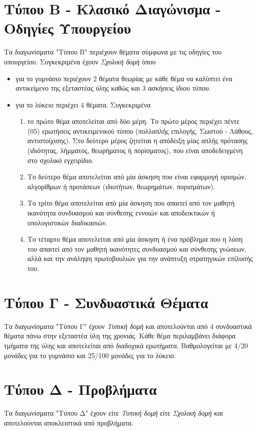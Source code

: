 \documentclass[11pt,a4paper]{book}
\begin{document}
\section{Τύπου Β - Κλασικό Διαγώνισμα - Οδηγίες Υπουργείου}
\noindent
Τα διαγωνίσματα "Τύπου Β" περιέχουν θέματα σύμφωνα με τις οδηγίες του υπουργείου. Συγκεκριμένα έχουν \textit{Σχολική δομή} όπου
\begin{itemize}
\item για το γυμνάσιο περιέχουν 2 θέματα θεωρίας με κάθε θέμα να καλύπτει ένα αντικείμενο της εξεταστέας ύλης καθώς και 3 ασκήσεις ίδιου τύπου.
\item για το λύκειο περιέχει 4 θέματα. Συγκεκριμένα
\begin{enumerate}
\item το πρώτο θέμα αποτελείται από δύο μέρη. Το πρώτο μέρος περιέχει πέντε (05) ερωτήσεις αντικειμενικού τύπου (πολλαπλής επιλογής, Σωστού - Λάθους, αντιστοίχισης). Στο δεύτερο μέρος ζητείται η απόδειξη μίας απλής πρότασης (ιδιότητας, λήμματος, θεωρήματος ή πορίσματος), που είναι αποδεδειγμένη στο σχολικό εγχειρίδιο.
\item Το δεύτερο θέμα αποτελείται από μία άσκηση που είναι εφαρμογή ορισμών, αλγορίθμων ή προτάσεων (ιδιοτήτων, θεωρημάτων, πορισμάτων).
\item Το τρίτο θέμα αποτελείται από μία άσκηση που απαιτεί από τον μαθητή ικανότητα συνδυασμού και σύνθεσης εννοιών και αποδεικτικών ή υπολογιστικών διαδικασιών.
\item Το τέταρτο θέμα αποτελείται από μία άσκηση ή ένα πρόβλημα που η λύση του απαιτεί από τον μαθητή ικανότητες συνδυασμού και σύνθεσης γνώσεων, αλλά και την ανάληψη πρωτοβουλιών για την ανάπτυξη στρατηγικών επίλυσής του.
\end{enumerate}
\end{itemize}
\section{Τύπου Γ - Συνδυαστικά Θέματα}
\noindent
Τα διαγωνίσματα "Τύπου Γ" έχουν \textit{Τυπική δομή} και αποτελούνται από $4$ συνδυαστικά θέματα πάνω στην εξεταστέα ύλη της χρονιάς. Κάθε θέμα περιλαμβάνει διάφορα τμήματα της ύλης και αποτελείται από διαδοχικά ερωτήματα. Βαθμολογείται με 4/20 μονάδες για το γυμνάσιο και 25/100 μονάδες για το λύκειο.
\section{Τύπου Δ - Προβλήματα}
Τα διαγωνίσματα "Τύπου Δ" έχουν είτε \textit{Τυπική δομή} είτε \textit{Σχολική δομή} και αποτελούνται αποκλειστικά από προβλήματα.
\end{document}
